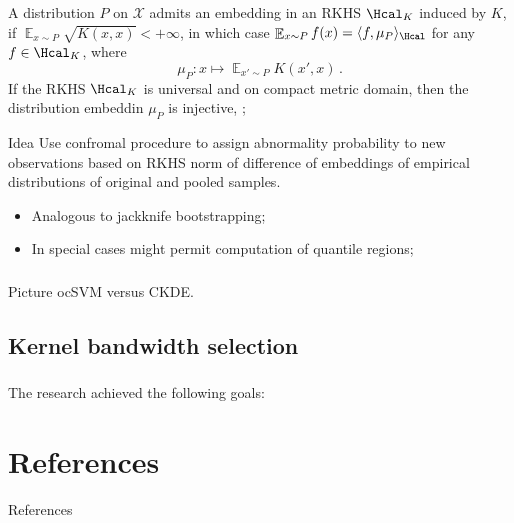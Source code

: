 \documentclass[t]{beamer}  %
\newcommand{\Xcal}{\mathcal{X}}
\newcommand{\ex}{\mathop{\mathbb{E}}\nolimits}
\begin{document}
\begin{frame}[c]\frametitle{\insertsection}
  \framesubtitle{\insertsubsection}
    A distribution $P$ on $\Xcal$ admits an embedding in an RKHS $\Hcal_K$ induced
    by $K$, if $\ex_{x\sim P} \sqrt{K(x,x)} < +\infty$, in which case $\ex_{x\sim P} f(x)
    = \langle f, \mu_P \rangle_\Hcal $ for any $f\in \Hcal_K$, where
    $$ \mu_P: x \mapsto \ex_{x'\sim P} K(x', x) \,. $$
    If the RKHS $\Hcal_K$ is universal and on compact metric domain, then the distribution
    embeddin $\mu_P$ is injective, \cite{gretton2012};

    \begin{block}{Idea}
    Use confromal procedure to assign abnormality probability to new observations
    based on RKHS norm of difference of embeddings of empirical distributions of
    original and pooled samples.
    \begin{itemize}
      \item Analogous to jackknife bootstrapping;
      \item In special cases might permit computation of quantile regions;
    \end{itemize}
    \end{block}
\end{frame}

\begin{frame}[c]\frametitle{\insertsection}
  \framesubtitle{\insertsubsection}
      Picture ocSVM versus CKDE.
\end{frame}


\subsection{Kernel bandwidth selection} %
\label{sub:kernel_bandwidth_selection}

\begin{frame}[c]\frametitle{\insertsection}

  The research achieved the following goals:
\end{frame}



\section{References} %
\label{sec:references}

\begin{frame}[t]{References}  
  
  
\end{frame}

\end{document}
